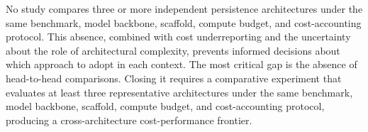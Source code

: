 No study compares three or more independent persistence architectures
under the same benchmark, model backbone, scaffold, compute budget, and
cost-accounting protocol.
This absence, combined with cost underreporting and the uncertainty
about the role of architectural complexity, prevents informed decisions
about which approach to adopt in each context.
The most critical gap is the absence of head-to-head comparisons.
Closing it requires a comparative experiment that evaluates at least
three representative architectures under the same benchmark, model
backbone, scaffold, compute budget, and cost-accounting protocol,
producing a cross-architecture cost-performance frontier.

